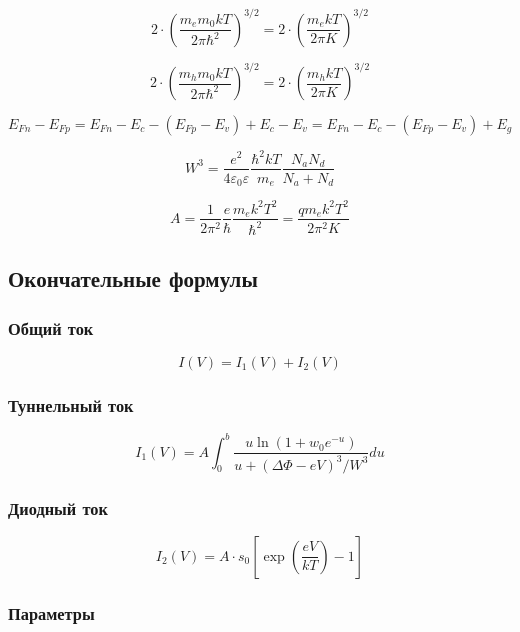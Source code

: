 \documentclass[
]{article}
\begin{document}
\[2 \cdot \left( \frac{m_e m_0 kT}{2\pi \hbar^2} \right)^{3/2} = 2 \cdot \left( \frac{m_e kT}{2\pi K} \right)^{3/2}\]

\[2 \cdot \left( \frac{m_h m_0 kT}{2\pi \hbar^2} \right)^{3/2} = 2 \cdot \left( \frac{m_h kT}{2\pi K} \right)^{3/2}\]

\[E_{Fn}-E_{Fp} = E_{Fn} - E_c -\left(E_{Fp} - E_v \right) +E_c-E_v= E_{Fn} - E_c -\left(E_{Fp} - E_v \right) +E_g\]

\[W^3 = \frac{e^{2}}{4\varepsilon_{0}\varepsilon}\frac{\hbar^{2}kT}{m_{e}}\frac{N_{a}N_{d}}{N_{a}+N_{d}} \tag{4}\]

\[A = \frac{1}{2\pi^2} \frac{e}{\hbar} \frac{m_e k^{2}T^{2}}{\hbar^2} = \frac{q m_e k^{2}T^{2}}{2\pi^2K} \tag{5}\]

\subsection{Окончательные
формулы}\label{ux43eux43aux43eux43dux447ux430ux442ux435ux43bux44cux43dux44bux435-ux444ux43eux440ux43cux443ux43bux44b}

\subsubsection{Общий
ток}\label{ux43eux431ux449ux438ux439-ux442ux43eux43a}

\[I\left(V\right)=I_{1}\left(V\right)+I_{2}\left(V\right) \tag{6}\]

\subsubsection{Туннельный
ток}\label{ux442ux443ux43dux43dux435ux43bux44cux43dux44bux439-ux442ux43eux43a}

\[I_{1}\left(V\right)=A\int_{0}^{b}\frac{u\ln\left(1+w_{0}e^{-u}\right)}{u+\left(\Delta\Phi-eV\right)^{3}/W^{3}}du \tag{7}\]

\subsubsection{Диодный
ток}\label{ux434ux438ux43eux434ux43dux44bux439-ux442ux43eux43a}

\[I_{2}\left(V\right)=A\cdot s_{0}\left[\exp\left(\frac{eV}{kT}\right)-1\right] \tag{8}\]

\subsubsection{Параметры}\label{ux43fux430ux440ux430ux43cux435ux442ux440ux44b}
\end{document}
